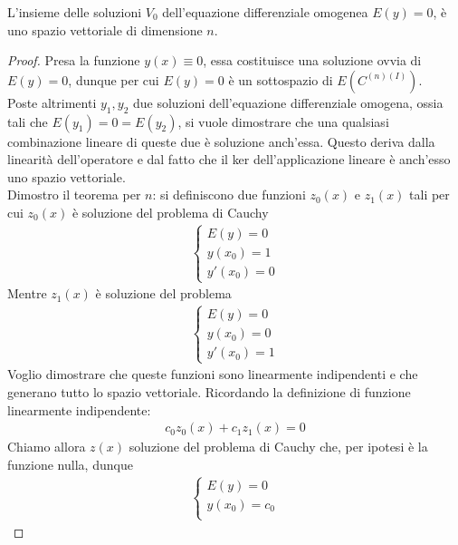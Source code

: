 \documentclass[a4paper, oneside]{book}
\begin{document}
\clearpage
\begin{theorem}[Teorema 1]
    L'insieme delle soluzioni $V_0$ dell'equazione differenziale omogenea $E(y) = 0$,
    è uno spazio vettoriale di dimensione $n$. 
\end{theorem}
\begin{proof}
    Presa la funzione $y(x) \equiv 0$, essa costituisce una soluzione ovvia di $E(y) = 0$,
    dunque per cui $E(y) = 0$ è un sottospazio di $E(C^{(n)(I)} )$. \\
    Poste altrimenti $y_1, y_2$ due soluzioni dell'equazione differenziale omogena, ossia
    tali che $E(y_1) = 0 = E(y_2)$, si vuole dimostrare che una qualsiasi 
    combinazione lineare di queste due è soluzione anch'essa. 
    Questo deriva dalla linearità dell'operatore e dal fatto che il ker 
    dell'applicazione lineare è anch'esso uno spazio vettoriale. \\
    Dimostro il teorema per $n$: si definiscono due funzioni $z_0(x)$ e $z_1(x)$
    tali per cui $z_0(x)$ è soluzione del problema di Cauchy
    \begin{gather*}
        \left\{\begin{array}{l}
            E(y) = 0 \\
            y(x_0) = 1 \\
            y'(x_0) = 0
        \end{array}\right.
    \end{gather*} 
    Mentre $z_1(x)$ è soluzione del problema
    \begin{gather*}
        \left\{\begin{array}{l}
            E(y) = 0 \\
            y(x_0)  =0 \\
            y'(x_0) = 1
        \end{array}\right.
    \end{gather*}
    Voglio dimostrare che queste funzioni sono linearmente indipendenti e che generano
    tutto lo spazio vettoriale. Ricordando la definizione di funzione
    linearmente indipendente:
    \begin{gather*}
        c_0z_0(x) + c_1z_1(x) = 0
    \end{gather*}
    Chiamo allora $z(x)$ soluzione del problema di Cauchy che, per ipotesi è la funzione nulla, dunque
    \begin{gather*}
        \left\{\begin{array}{l}
            E(y) = 0 \\
            y(x_0) = c_0 \\

\end{array}
\end{gather*}
\end{proof}
\end{document}
